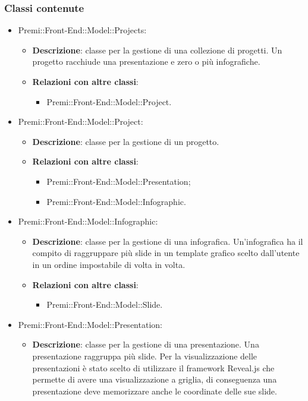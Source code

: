 \subsubsection{Classi contenute}
\begin{itemize}
	\item Premi::Front-End::Model::Projects:
	\begin{itemize}
		\item \textbf{Descrizione}: classe per la gestione di una collezione di progetti. Un progetto racchiude una presentazione e zero o più infografiche.
		\item \textbf{Relazioni con altre classi}:
		\begin{itemize}
			\item Premi::Front-End::Model::Project.
		\end{itemize}
	\end{itemize}
	\item  Premi::Front-End::Model::Project:
	\begin{itemize}
		\item \textbf{Descrizione}: classe per la gestione di un progetto.
		\item \textbf{Relazioni con altre classi}:
		\begin{itemize}
			\item Premi::Front-End::Model::Presentation;
			\item Premi::Front-End::Model::Infographic.
		\end{itemize}
	\end{itemize}
	\item  Premi::Front-End::Model::Infographic:
	\begin{itemize}
		\item \textbf{Descrizione}: classe per la gestione di una \gls{infografica}. Un'\gls{infografica} ha il compito di raggruppare più \gls{slide} in un \gls{template} grafico scelto dall'utente in un ordine impostabile di volta in volta.
		\item \textbf{Relazioni con altre classi}:
		\begin{itemize}
			\item Premi::Front-End::Model::Slide.
		\end{itemize}
	\end{itemize}
	\item   Premi::Front-End::Model::Presentation:
	\begin{itemize}
		\item \textbf{Descrizione}: classe per la gestione di una presentazione. Una presentazione raggruppa più \gls{slide}. Per la visualizzazione delle presentazioni è stato scelto di utilizzare il \gls{framework} \gls{Reveal.js} che permette di avere una visualizzazione a griglia, di conseguenza una presentazione deve memorizzare anche le coordinate delle sue \gls{slide}.

\end{itemize}
\end{itemize}
